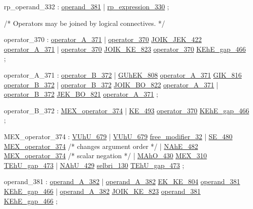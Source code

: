 \label{html:y332}
rp_operand_332          :  \hyperref[html:y381]{operand_381}
                        |  \hyperref[html:y330]{rp_expression_330}
                        ;

/*  Operators may be joined by logical connectives. */

\label{html:y370}
operator_370            :  \hyperref[html:y371]{operator_A_371}
                        |  \hyperref[html:y370]{operator_370}  \hyperref[html:y422]{JOIK_JEK_422}  \hyperref[html:y371]{operator_A_371}
                        |  \hyperref[html:y370]{operator_370}  \hyperref[html:y823]{JOIK_KE_823}  \hyperref[html:y370]{operator_370}
                                \hyperref[html:y466]{KEhE_gap_466}
                        ;

\label{html:y371}
operator_A_371          :  \hyperref[html:y372]{operator_B_372}
                        |  \hyperref[html:y808]{GUhEK_808}  \hyperref[html:y371]{operator_A_371}  \hyperref[html:y816]{GIK_816}  \hyperref[html:y372]{operator_B_372}
                        |  \hyperref[html:y372]{operator_B_372}  \hyperref[html:y822]{JOIK_BO_822}  \hyperref[html:y371]{operator_A_371}
                        |  \hyperref[html:y372]{operator_B_372}  \hyperref[html:y821]{JEK_BO_821}  \hyperref[html:y371]{operator_A_371}
                        ;

\label{html:y372}
operator_B_372          :  \hyperref[html:y374]{MEX_operator_374}
                        |  \hyperref[html:y493]{KE_493}  \hyperref[html:y370]{operator_370}  \hyperref[html:y466]{KEhE_gap_466}
                        ;

\label{html:y374}
MEX_operator_374        :  \hyperref[html:y679]{VUhU_679}
                        |  \hyperref[html:y679]{VUhU_679}  \hyperref[html:y32]{free_modifier_32}
                        |  \hyperref[html:y480]{SE_480}  \hyperref[html:y374]{MEX_operator_374}
   /* changes argument order */
                        |  \hyperref[html:y482]{NAhE_482}  \hyperref[html:y374]{MEX_operator_374}
   /* scalar negation */
                        |  \hyperref[html:y430]{MAhO_430}  \hyperref[html:y310]{MEX_310}  \hyperref[html:y473]{TEhU_gap_473}
                        |  \hyperref[html:y429]{NAhU_429}  \hyperref[html:y130]{selbri_130}  \hyperref[html:y473]{TEhU_gap_473}
                        ;

\label{html:y381}
operand_381             :  \hyperref[html:y382]{operand_A_382}
                        |  \hyperref[html:y382]{operand_A_382}  \hyperref[html:y804]{EK_KE_804}  \hyperref[html:y381]{operand_381}  \hyperref[html:y466]{KEhE_gap_466}
                        |  \hyperref[html:y382]{operand_A_382}  \hyperref[html:y823]{JOIK_KE_823}  \hyperref[html:y381]{operand_381}  \hyperref[html:y466]{KEhE_gap_466}
                        ;

